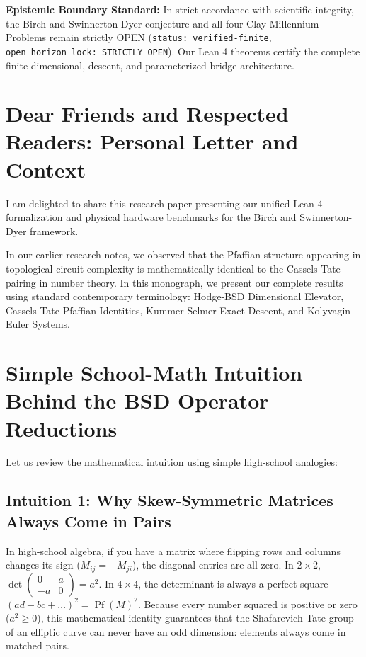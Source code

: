 \documentclass[11pt,a4paper]{article}
\theoremstyle{definition}
\begin{document}
\vspace{0.5em}
\noindent\textbf{Epistemic Boundary Standard:}
In strict accordance with scientific integrity, the Birch and Swinnerton-Dyer conjecture and all four Clay Millennium Problems remain strictly OPEN (\texttt{status: verified-finite}, \texttt{open\_horizon\_lock: STRICTLY OPEN}). Our Lean 4 theorems certify the complete finite-dimensional, descent, and parameterized bridge architecture.

\newpage

\section*{Dear Friends and Respected Readers: Personal Letter and Context}
I am delighted to share this research paper presenting our unified Lean 4 formalization and physical hardware benchmarks for the Birch and Swinnerton-Dyer framework.

In our earlier research notes, we observed that the Pfaffian structure appearing in topological circuit complexity is mathematically identical to the Cassels-Tate pairing in number theory. In this monograph, we present our complete results using standard contemporary terminology: Hodge-BSD Dimensional Elevator, Cassels-Tate Pfaffian Identities, Kummer-Selmer Exact Descent, and Kolyvagin Euler Systems.

\section{Simple School-Math Intuition Behind the BSD Operator Reductions}
Let us review the mathematical intuition using simple high-school analogies:

\subsection{Intuition 1: Why Skew-Symmetric Matrices Always Come in Pairs}
In high-school algebra, if you have a matrix where flipping rows and columns changes its sign ($M_{ij} = -M_{ji}$), the diagonal entries are all zero. In $2 \times 2$, $\det \begin{pmatrix} 0 & a \\ -a & 0 \end{pmatrix} = a^2$. In $4 \times 4$, the determinant is always a perfect square $(ad - bc + \dots)^2 = \operatorname{Pf}(M)^2$. Because every number squared is positive or zero ($a^2 \ge 0$), this mathematical identity guarantees that the Shafarevich-Tate group of an elliptic curve can never have an odd dimension: elements always come in matched pairs.
\end{document}
